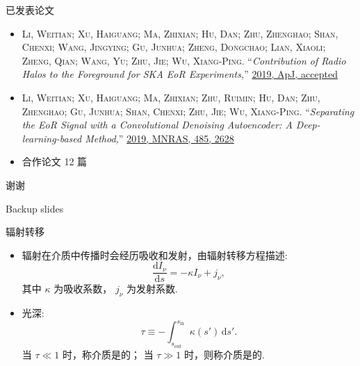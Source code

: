 \documentclass{beamer}
\newcommand{\R}[1]{\text{#1}}  %
\newcommand{\D}[1]{\R{d}#1}
\newcommand{\diff}[2]{\frac{\D{#1}}{\D{#2}}}
\let\emph\relax  %
\begin{document}
\begin{frame}{已发表论文}
  \small
  \begin{itemize}
    \item
      \textsc{\alert{Li, Weitian}; Xu, Haiguang; Ma, Zhixian; Hu, Dan;
      Zhu, Zhenghao; Shan, Chenxi; Wang, Jingying; Gu, Junhua;
      Zheng, Dongchao; Lian, Xiaoli; Zheng, Qian; Wang, Yu;
      Zhu, Jie; Wu, Xiang-Ping}.
      \enquote{\it Contribution of Radio Halos to the Foreground for
        SKA EoR Experiments,}
      \href{http://adsabs.harvard.edu/abs/arXiv:1905.05399}{%
        2019, ApJ, accepted}
    \item
      \textsc{\alert{Li, Weitian}; Xu, Haiguang; Ma, Zhixian; Zhu, Ruimin;
      Hu, Dan; Zhu, Zhenghao; Gu, Junhua; Shan, Chenxi; Zhu, Jie;
      Wu, Xiang-Ping}.
      \enquote{\it Separating the EoR Signal with a Convolutional Denoising
        Autoencoder: A Deep-learning-based Method,}
      \href{http://adsabs.harvard.edu/abs/2019MNRAS.485.2628L}{%
        2019, MNRAS, 485, 2628}
    \item
      合作论文 12 篇
  \end{itemize}
\end{frame}

\begin{frame}[standout]
  \Huge 谢\cspace{}谢

\end{frame}


\appendix

\begin{frame}[standout]
  Backup slides
\end{frame}

\begin{frame}{辐射转移}
  \begin{itemize}
    \item 辐射在介质中传播时会经历吸收和发射，由\alert{辐射转移方程}描述:
      \begin{equation}
        \diff{I_{\nu}}{s} = -\kappa I_{\nu} + j_{\nu} ,
      \end{equation}
      其中 $\kappa$ 为吸收系数， $j_{\nu}$ 为发射系数.
    \item \alert{光深}:
      \begin{equation}
        \tau \equiv
          - \int_{s_{\R{out}}}^{s_{\R{in}}} \kappa(s') \,\D{s'} .
      \end{equation}
      当 $\tau \ll 1$ 时，称介质是\emph{光学薄}的；
      当 $\tau \gg 1$ 时，则称介质是\emph{光学厚}的.
  \end{itemize}
\end{frame}
\end{document}

